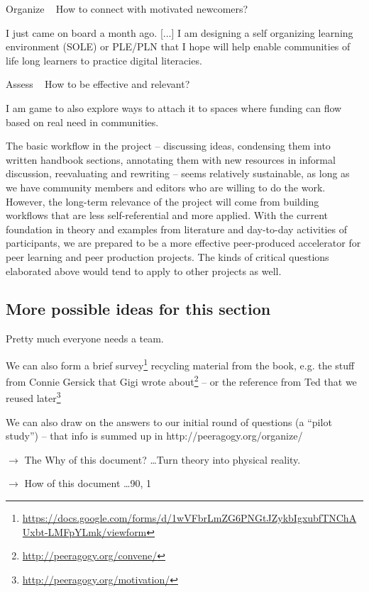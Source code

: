 \documentclass[twoside]{article}
\begin{document}
\begin{multicols}{2}
    Organize ~ How to connect with motivated newcomers?

        I just came on board a month ago. [...] I am designing a self organizing learning environment (SOLE) or PLE/PLN that I hope will help enable communities of life long learners to practice digital literacies.

    Assess ~ How to be effective and relevant?

        I am game to also explore ways to attach it to spaces where funding can flow based on real need in communities.

The basic workflow in the project -- discussing ideas, condensing them into written handbook sections, annotating them with new resources in informal discussion, reevaluating and rewriting -- seems relatively sustainable, as long as we have community members and editors who are willing to do the work. However, the long-term relevance of the project will come from building workflows that are less self-referential and more applied. With the current foundation in theory and examples from literature and day-to-day activities of participants, we are prepared to be a more effective peer-produced accelerator for peer learning and peer production projects. The kinds of critical questions elaborated above would tend to apply to other projects as well.

\subsection{More possible ideas for this section}

Pretty much everyone needs a team.

We can also form a brief survey\footnote{\url{https://docs.google.com/forms/d/1wVFbrLmZG6PNGtJZykbIgxubfTNChAUxbt-LMFpYLmk/viewform}} recycling material from the book, e.g. the stuff from Connie Gersick that Gigi wrote about\footnote{\url{http://peeragogy.org/convene/}} -- or the reference from Ted that we reused later\footnote{\url{http://peeragogy.org/motivation/}}

We can also draw on the answers to our initial round of questions (a ``pilot study'') -- that info is summed up in http://peeragogy.org/organize/

$\rightarrow$ The Why of this document? \ldots Turn theory into physical reality.

$\rightarrow$ How of this document \ldots 90, 1 %


\end{multicols}
\end{document}
